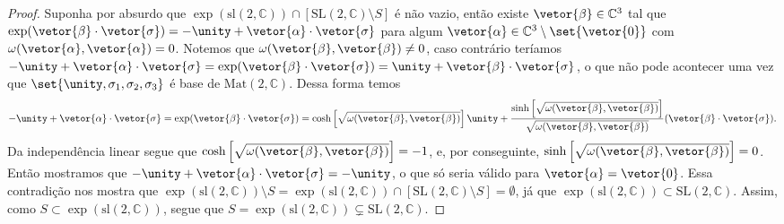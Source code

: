 \begin{proof}
    Suponha por absurdo que \(\exp(\mathrm{sl}(2,\mathbb{C})) \cap \left[\mathrm{SL}(2,\mathbb{C})\setminus S\right]\) é não vazio, então existe \(\vetor{\beta} \in \mathbb{C}^3\) tal que \(\exp(\vetor{\beta}\cdot \vetor{\sigma}) = -\unity + \vetor{\alpha}\cdot\vetor{\sigma}\) para algum \(\vetor{\alpha} \in \mathbb{C}^3 \setminus \set{\vetor{0}}\) com \(\omega(\vetor{\alpha}, \vetor{\alpha}) = 0\). Notemos que \(\omega(\vetor{\beta},\vetor{\beta}) \neq 0\), caso contrário teríamos \(-\unity + \vetor{\alpha} \cdot \vetor{\sigma} = \exp(\vetor{\beta}\cdot \vetor{\sigma}) = \unity + \vetor{\beta}\cdot\vetor{\sigma}\), o que não pode acontecer uma vez que \(\set{\unity, \sigma_1, \sigma_2, \sigma_3}\) é base de \(\mathrm{Mat}(2, \mathbb{C})\). Dessa forma temos
    \begin{equation*}
        -\unity + \vetor{\alpha}\cdot\vetor{\sigma} = \exp(\vetor{\beta}\cdot \vetor{\sigma}) = \cosh\left[\sqrt{\omega(\vetor{\beta},\vetor{\beta})}\right] \unity + \frac{\sinh\left[\sqrt{\omega(\vetor{\beta}, \vetor{\beta})}\right]}{\sqrt{\omega(\vetor{\beta},\vetor{\beta})}}(\vetor{\beta}\cdot\vetor{\sigma}).
    \end{equation*}
    Da independência linear segue que \(\cosh\left[\sqrt{\omega(\vetor{\beta}, \vetor{\beta})}\right] = -1\), e, por conseguinte, \(\sinh\left[\sqrt{\omega(\vetor{\beta}, \vetor{\beta})}\right] = 0\). Então mostramos que \(-\unity + \vetor{\alpha} \cdot \vetor{\sigma} = -\unity\), o que só seria válido para \(\vetor{\alpha} = \vetor{0}\). Essa contradição nos mostra que \( \exp(\mathrm{sl}(2,\mathbb{C})) \setminus S = \exp(\mathrm{sl}(2,\mathbb{C})) \cap \left[\mathrm{SL}(2,\mathbb{C})\setminus S\right] =\emptyset\), já que \(\exp(\mathrm{sl}(2,\mathbb{C})) \subset \mathrm{SL}(2,\mathbb{C})\). Assim, como \(S \subset \exp(\mathrm{sl}(2,\mathbb{C}))\), segue que \(S = \exp(\mathrm{sl}(2, \mathbb{C})) \subsetneq \mathrm{SL}(2,\mathbb{C})\).
\end{proof}

